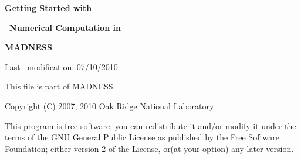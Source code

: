 \documentclass[letterpaper]{article}
\title{}
\author{Robert Harrison}
\date{2010-07-17}
\begin{document}
\clearpage\setcounter{page}{1}\pagestyle{Licensepage}
\thispagestyle{Titlepage}

\bigskip


\bigskip


\bigskip


\bigskip


\bigskip


\bigskip


\bigskip


\bigskip


\bigskip

{\centering\bfseries
Getting Started with
\par}

{\centering\bfseries
\ Numerical Computation in
\par}

{\centering\bfseries
MADNESS
\par}


\bigskip


\bigskip


\bigskip


\bigskip


\bigskip


\bigskip


\bigskip


\bigskip


\bigskip

{\centering
Last \ modification: 07/10/2010
\par}


\bigskip


\bigskip


\bigskip


\bigskip


\bigskip


\bigskip


\bigskip


\bigskip


\bigskip


\bigskip


\bigskip


\bigskip


\bigskip


\bigskip


\bigskip

This file is part of MADNESS.

Copyright (C) 2007, 2010 Oak Ridge National Laboratory

This program is free software; you can redistribute it and/or modify it under the terms of the GNU General Public
License as published by the Free Software Foundation; either version 2 of the License, or(at your option) any later
version.
\end{document}

